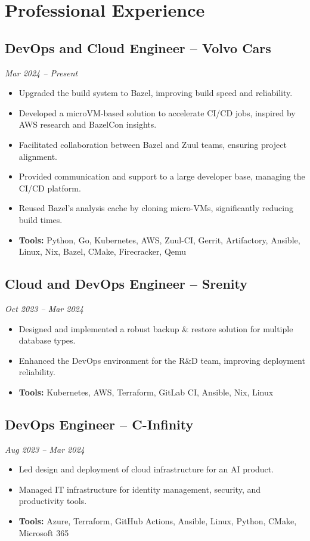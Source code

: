 \documentclass[11pt,a4paper]{article}
\begin{document}
\section{Professional Experience}

\subsection{DevOps and Cloud Engineer -- Volvo Cars}
\textit{Mar 2024 -- Present}
\begin{itemize}[leftmargin=*]
    \item Upgraded the build system to Bazel, improving build speed and reliability.
    \item Developed a microVM-based solution to accelerate CI/CD jobs, inspired by AWS research and BazelCon insights.
    \item Facilitated collaboration between Bazel and Zuul teams, ensuring project alignment.
    \item Provided communication and support to a large developer base, managing the CI/CD platform.
    \item Reused Bazel's analysis cache by cloning micro-VMs, significantly reducing build times.
    \item \textbf{Tools:} Python, Go, Kubernetes, AWS, Zuul-CI, Gerrit, Artifactory, Ansible, Linux, Nix, Bazel, CMake, Firecracker, Qemu
\end{itemize}

\subsection{Cloud and DevOps Engineer -- Srenity}
\textit{Oct 2023 -- Mar 2024}
\begin{itemize}[leftmargin=*]
    \item Designed and implemented a robust backup \& restore solution for multiple database types.
    \item Enhanced the DevOps environment for the R\&D team, improving deployment reliability.
    \item \textbf{Tools:} Kubernetes, AWS, Terraform, GitLab CI, Ansible, Nix, Linux
\end{itemize}

\subsection{DevOps Engineer -- C-Infinity}
\textit{Aug 2023 -- Mar 2024}
\begin{itemize}[leftmargin=*]
    \item Led design and deployment of cloud infrastructure for an AI product.
    \item Managed IT infrastructure for identity management, security, and productivity tools.
    \item \textbf{Tools:} Azure, Terraform, GitHub Actions, Ansible, Linux, Python, CMake, Microsoft 365
\end{itemize}
\end{document}
